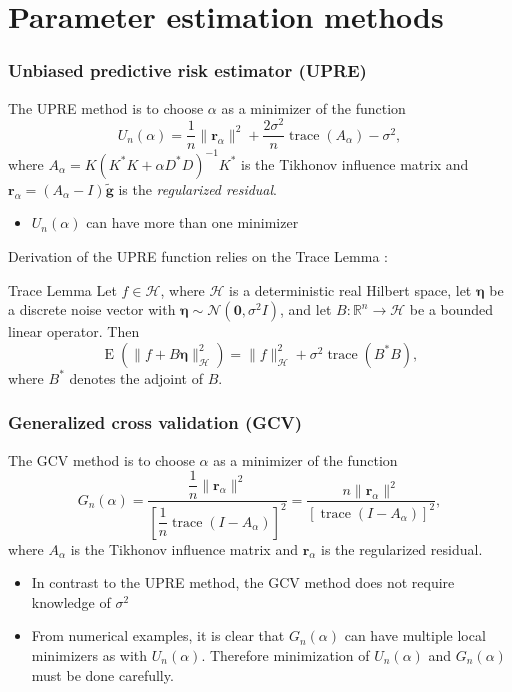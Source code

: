 \documentclass[t]{beamer}
\newcommand{\noiseSD}{\sigma}	%
\DeclareMathOperator{\E}{E}	%
\newcommand{\gnoiseVec}{\widetilde{\mathbf{g}}}	%
\newcommand{\kMat}{K}	%
\newcommand{\ctrans}{*}	%
\DeclareMathOperator{\trace}{trace}		%
\newcommand{\regparam}{\alpha}
\newcommand{\regres}{\mathbf{r}_{\regparam}}	%
\newcommand{\A}{A_{\regparam}}	%
\newcommand{\U}{U}	%
\newcommand{\GCV}{G}	%
\begin{document}
\section{Parameter estimation methods}

\begin{frame}
\frametitle{Unbiased predictive risk estimator (UPRE)}
The UPRE method \cite{Mallows1973} is to choose $\regparam$ as a minimizer of the function
\[\U_n(\regparam) = \frac{1}{n}\|\regres\|^2 + \frac{2\noiseSD^2}{n}\trace(\A) - \noiseSD^2,\]
where $\A = \kMat(\kMat^\ctrans{\kMat} + \regparam{D^\ctrans}D)^{-1}\kMat^\ctrans$ is the Tikhonov influence matrix and $\regres = (\A - I)\gnoiseVec$ is the \textit{regularized residual}.
\begin{itemize}
\item $\U_n(\regparam)$ can have more than one minimizer \cite[p.~100]{Vogel:2002}
\end{itemize}
Derivation of the UPRE function relies on the Trace Lemma \cite[p.~98]{Vogel:2002}:
\begin{block}{Trace Lemma}
Let $f \in \mathcal{H}$, where $\mathcal{H}$ is a deterministic real Hilbert space, let $\mathbf{\eta}$ be a discrete noise vector with $\mathbf{\eta} \sim \mathcal{N}(\mathbf{0},\noiseSD^2 I)$, and let $B : \mathbb{R}^n \rightarrow \mathcal{H}$ be a bounded linear operator. Then
\[\E(\|f + B\mathbf{\eta}\|^2_{\mathcal{H}}) = \|f\|^2_{\mathcal{H}} + \noiseSD^2 \trace(B^\ctrans{B}),\] 
where $B^\ctrans$ denotes the adjoint of $B$.
\end{block}
\end{frame}

\begin{frame}
\frametitle{Generalized cross validation (GCV)}
The GCV method \cite{Wahba1977,Wahba1990} is to choose $\regparam$ as a minimizer of the function
\[\GCV_n(\regparam) = \frac{\dfrac{1}{n}\|\regres\|^2}{\left[\dfrac{1}{n}\trace(I-\A)\right]^2} = \frac{n\|\regres\|^2}{\left[\trace(I-\A)\right]^2},\]
where $\A$ is the Tikhonov influence matrix and $\regres$ is the regularized residual.
\begin{itemize}
\item In contrast to the UPRE method, the GCV method does not require knowledge of $\noiseSD^2$
\item From numerical examples, it is clear that $\GCV_n(\regparam)$ can have multiple local minimizers as with $\U_n(\regparam)$. Therefore minimization of $\U_n(\regparam)$ and $\GCV_n(\regparam)$ must be done carefully.
\end{itemize}
\end{frame}
\end{document}
